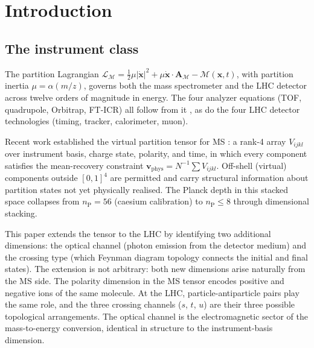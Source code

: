\documentclass[twocolumn,10pt,a4paper]{article}
\theoremstyle{thmstyle}
\theoremstyle{definition}
\theoremstyle{remark}
\newcommand{\nP}{n_{\mathrm{P}}}
\newcommand{\LM}{\mathcal{L}_{\mathcal{M}}}
\newcommand{\AM}{\mathbf{A}_{\mathcal{M}}}
\newcommand{\Mop}{\mathcal{M}}
\begin{document}
\begin{abstract}
The framework is grounded in mass spectrometry throughout: every LHC
construction is presented as the natural extension of a validated
MS result.

\medskip
\noindent\textbf{Keywords:} extended partition tensor; virtual substates;
Ritz combinations; crossing symmetry; Mandelstam variables; optical channel;
missing transverse energy; mean-recovery; SEBD reconstruction; LHC hologram;
spectral holography; Stokes shift analog
\end{abstract}

\tableofcontents

\section{Introduction}
\label{sec:intro}

\subsection{The instrument class}

The partition Lagrangian $\LM = \tfrac{1}{2}\mu|\dot{\mathbf{x}}|^2
+ \mu\dot{\mathbf{x}}\cdot\AM - \Mop(\mathbf{x},t)$,
with partition inertia $\mu = \alpha(m/z)$, governs both the mass spectrometer
and the LHC detector across twelve orders of magnitude in energy.
The four analyzer equations (TOF, quadrupole, Orbitrap, FT-ICR) all follow
from it \citep{companion:spectrometer}, as do the four LHC detector technologies
(timing, tracker, calorimeter, muon).

Recent work established the virtual partition tensor for MS
\citep{companion:tensor}: a rank-4 array $V_{ijkl}$ over instrument basis,
charge state, polarity, and time, in which every component satisfies the
mean-recovery constraint
$\mathbf{v}_{\mathrm{phys}} = N^{-1}\sum V_{ijkl}$.
Off-shell (virtual) components outside $[0,1]^4$ are permitted and carry
structural information about partition states not yet physically realised.
The Planck depth in this stacked space collapses from $\nP = 56$
(caesium calibration) to $\nP \leq 8$ through dimensional stacking.

This paper extends the tensor to the LHC by identifying two additional
dimensions: the optical channel (photon emission from the detector medium)
and the crossing type (which Feynman diagram topology connects the initial
and final states).  The extension is not arbitrary: both new dimensions
arise naturally from the MS side.  The polarity dimension in the MS tensor
encodes positive and negative ions of the same molecule.  At the LHC,
particle-antiparticle pairs play the same role, and the three crossing
channels ($s$, $t$, $u$) are their three possible topological arrangements.
The optical channel is the electromagnetic sector of the mass-to-energy
conversion, identical in structure to the instrument-basis dimension.
\end{document}
